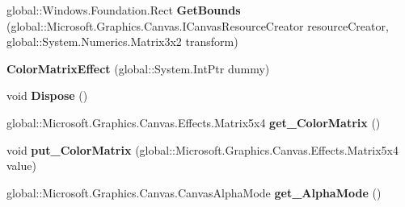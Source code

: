 \begin{DoxyCompactItemize}
\item 
\mbox{\label{class_microsoft_1_1_graphics_1_1_canvas_1_1_effects_1_1_color_matrix_effect_a0e2f82cd686772845a245ad6d4195b00}} 
global\+::\+Windows.\+Foundation.\+Rect {\bfseries Get\+Bounds} (global\+::\+Microsoft.\+Graphics.\+Canvas.\+I\+Canvas\+Resource\+Creator resource\+Creator, global\+::\+System.\+Numerics.\+Matrix3x2 transform)
\item 
\mbox{\label{class_microsoft_1_1_graphics_1_1_canvas_1_1_effects_1_1_color_matrix_effect_a0961cd0876bc2b7499a3e547f7418c29}} 
{\bfseries Color\+Matrix\+Effect} (global\+::\+System.\+Int\+Ptr dummy)
\item 
\mbox{\label{class_microsoft_1_1_graphics_1_1_canvas_1_1_effects_1_1_color_matrix_effect_ae0856b4a12befe77832ff39a67427820}} 
void {\bfseries Dispose} ()
\item 
\mbox{\label{class_microsoft_1_1_graphics_1_1_canvas_1_1_effects_1_1_color_matrix_effect_a74b7638815e4e2ee11e421a48b5a1a54}} 
global\+::\+Microsoft.\+Graphics.\+Canvas.\+Effects.\+Matrix5x4 {\bfseries get\+\_\+\+Color\+Matrix} ()
\item 
\mbox{\label{class_microsoft_1_1_graphics_1_1_canvas_1_1_effects_1_1_color_matrix_effect_a7d95e32f42f71f48b84cc81284f1023f}} 
void {\bfseries put\+\_\+\+Color\+Matrix} (global\+::\+Microsoft.\+Graphics.\+Canvas.\+Effects.\+Matrix5x4 value)
\item 
\mbox{\label{class_microsoft_1_1_graphics_1_1_canvas_1_1_effects_1_1_color_matrix_effect_abfdb6c68cffed7e33d14c5dac4b1ea80}} 
global\+::\+Microsoft.\+Graphics.\+Canvas.\+Canvas\+Alpha\+Mode {\bfseries get\+\_\+\+Alpha\+Mode} ()
\item 
\mbox{\label{class_microsoft_1_1_graphics_1_1_canvas_1_1_effects_1_1_color_matrix_effect_aecefb800adc320dde05a7b4b9ec65fe0}} 

\end{DoxyCompactItemize}
